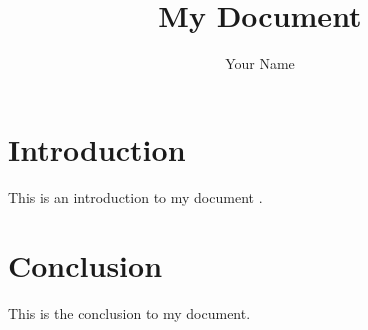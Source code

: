 \documentclass{article}
\begin{document}
\title{My Document}
\author{Your Name}
\maketitle

\section{Introduction}

This is an introduction to my document \citep{dummy}.





\section{Conclusion}
This is the conclusion to my document.



\end{document}
